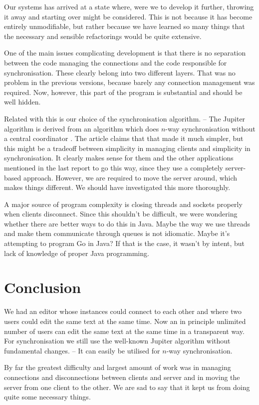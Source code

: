 \documentclass[a4paper,final,12pt,oneside,article,table]{memoir}
\begin{document}
Our systems has arrived at a state where, were we to develop it further,
throwing it away and starting over might be considered. This is not
because it has become entirely unmodifiable, but rather because we have
learned so many things that the necessary and sensible refactorings
would be quite extensive.

One of the main issues complicating development is that there is no
separation between the code managing the connections and the code
responsible for synchronisation. These clearly belong into two different
layers. That was no problem in the previous versions, because barely any
connection management was required. Now, however, this part of the
program is substantial and should be well hidden.

Related with this is our choice of the synchronisation algorithm. – The
Jupiter algorithm is derived from an algorithm which does $n$-way
synchronisation without a central coordinator \cite{Jupiter}. The
article claims that that made it much simpler, but this might be a
tradeoff between simplicity in managing clients and simplicity in
synchronisation. It clearly makes sense for them and the other
applications mentioned in the last report to go this way, since
they use a completely server-based approach. However, we are required to
move the server around, which makes things different.  We should have
investigated this more thoroughly. 

A major source of program complexity is closing threads and sockets
properly when clients disconnect. Since this shouldn't be difficult, we
were wondering whether there are better ways to do this in Java. Maybe
the way we use threads and make them communicate through queues is not
idiomatic. Maybe it's attempting to program Go in Java? If that is the
case, it wasn't by intent, but lack of knowledge of proper Java
programming.

\chapter{Conclusion}

We had an editor whose instances could connect to each other and where
two users could edit the same text at the same time. Now an in principle
unlimited number of users can edit the same text at the same time in a
transparent way. For synchronisation we still use the well-known Jupiter
algorithm without fundamental changes. – It can easily be utilised for
$n$-way synchronisation.

By far the greatest difficulty and largest amount of work was in
managing connections and disconnections between clients and server and
in moving the server from one client to the other. We are sad to say
that it kept us from doing quite some necessary things.
\end{document}
